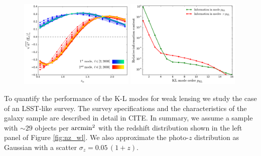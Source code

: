 \documentclass[twocolumn,amsfont,amssymb,amsmath, showpacs,balancelastpage, nofootinbib]{revtex4-1}
\begin{document}
    \begin{figure}
      \centering
      \includegraphics[width=0.49\textwidth]{Figs/kl_modes_wl}
      \includegraphics[width=0.49\textwidth]{Figs/information_wl}
      \caption{}\label{fig:kl_wl}
    \end{figure}
    To quantify the performance of the K-L modes for weak lensing we study the case of an LSST-like survey. The survey specifications and the characteristics of the galaxy sample are described in detail in CITE. In summary, we assume a sample with $\sim29$ objects per ${\rm arcmin}^2$ with the redshift distribution shown in the left panel of Figure \ref{fig:nz_wl}. We also approximate the photo-$z$ distribution as Gaussian with a scatter $\sigma_z=0.05\,(1+z)$.    
    
\end{document}
